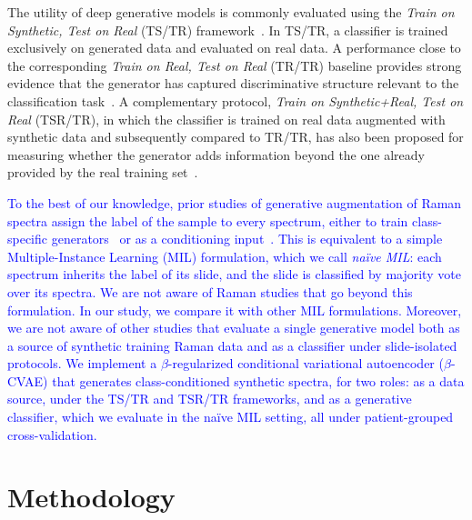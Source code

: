 \documentclass[12pt]{article}
\theoremstyle{paper}
\begin{document}
The utility of deep generative models is commonly evaluated using the \emph{Train on Synthetic, Test on Real} (TS/TR) framework~\cite{esteban2017real}. In TS/TR, a classifier is trained exclusively on generated data and evaluated on real data. A performance close to the corresponding \emph{Train on Real, Test on Real} (TR/TR) baseline provides strong evidence that the generator has captured discriminative structure relevant to the classification task~\cite{esteban2017real}. A complementary protocol, \emph{Train on Synthetic+Real, Test on Real} (TSR/TR), in which the classifier is trained on real data augmented with synthetic data and subsequently compared to TR/TR, has also been proposed for measuring whether the generator adds information beyond the one already provided by the real training set~\cite{kiyasseh2020pleth}. 

\textcolor{blue}{To the best of our knowledge, prior studies of generative augmentation of Raman spectra assign the label of the sample to every spectrum, either to train class-specific generators~\cite{wu2021raman} or as a conditioning input~\cite{zhao2024raman}. This is equivalent to a simple Multiple-Instance Learning (MIL) formulation, which we call \emph{naïve MIL}: each spectrum inherits the label of its slide, and the slide is classified by majority vote over its spectra. We are not aware of Raman studies that go beyond this formulation. In our study, we compare it with other MIL formulations. Moreover, we are not aware of other studies that evaluate a single generative model both as a source of synthetic training Raman data and as a classifier under slide-isolated protocols. We implement a $\beta$-regularized conditional variational autoencoder ($\beta$-CVAE) that generates class-conditioned synthetic spectra, for two roles: as a data source, under the TS/TR and TSR/TR frameworks, and as a generative classifier, which we evaluate in the naïve MIL setting, all under patient-grouped cross-validation.}

\section{Methodology}
\label{sec:methodology}

\end{document}
